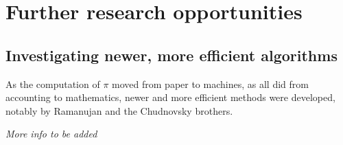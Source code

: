 \section{Further research opportunities}

\subsection{Investigating newer, more efficient algorithms}

As the computation of $\pi$ moved from paper to machines, as all did from accounting to 
mathematics, newer and more efficient methods were developed, notably by Ramanujan and 
the Chudnovsky brothers. 

\textit{More info to be added}